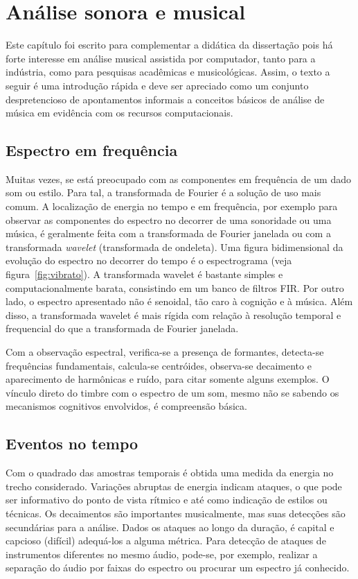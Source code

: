 \chapter{Análise sonora e musical}
Este capítulo foi escrito para complementar a didática da dissertação pois há forte interesse em análise musical assistida por computador, tanto para a indústria, como para pesquisas acadêmicas e musicológicas. Assim, o texto a seguir é uma introdução rápida e deve ser apreciado como um conjunto despretencioso de apontamentos informais a conceitos básicos de análise de música em evidência com os recursos computacionais.

\section{Espectro em frequência}\label{subsec:especFreq}
Muitas vezes, se está preocupado com as componentes em frequência de um dado som ou estilo. Para tal, a transformada de Fourier é a solução de uso mais comum. A localização de energia no tempo e em frequência, por exemplo para observar as componentes do espectro no decorrer de uma sonoridade ou uma música, é geralmente feita com a transformada de Fourier janelada ou com a transformada \emph{wavelet} (transformada de ondeleta). Uma figura bidimensional da evolução do espectro no decorrer do tempo é o espectrograma (veja figura~\ref{fig:vibrato}). A transformada wavelet é bastante simples e computacionalmente barata, consistindo em um banco de filtros FIR. Por outro lado, o espectro apresentado não é senoidal, tão caro à cognição e à música. Além disso, a transformada wavelet é mais rígida com relação à resolução temporal e frequencial do que a transformada de Fourier janelada.

Com a observação espectral, verifica-se a presença de formantes, detecta-se frequências fundamentais, calcula-se centróides, observa-se decaimento e aparecimento de harmônicas e ruído, para citar somente alguns exemplos. O vínculo direto do timbre com o espectro de um som, mesmo não se sabendo os mecanismos cognitivos envolvidos, é compreensão básica.

\section{Eventos no tempo}\label{subsec:eventosTempo}
Com o quadrado das amostras temporais é obtida uma medida da energia no trecho considerado. Variações abruptas de energia indicam ataques, o que pode ser informativo do ponto de vista rítmico e até como indicação de estilos ou técnicas. Os decaimentos são importantes musicalmente, mas suas detecções são secundárias para a análise. Dados os ataques ao longo da duração, é capital e capcioso (difícil) adequá-los a alguma métrica. Para detecção de ataques de instrumentos diferentes no mesmo áudio, pode-se, por exemplo, realizar a separação do áudio por faixas do espectro ou procurar um espectro já conhecido.

